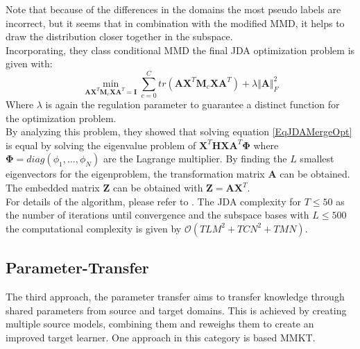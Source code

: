 Note that because of the differences in the domains the most pseudo labels are incorrect, but it seems that in combination with the modified \acs{MMD}, it helps to draw the distribution closer together in the subspace.\cite{Long.}\\
Incorporating, they class conditional \acs{MMD} the final \acs{JDA} optimization problem is given with:\cite{Long.}
\begin{equation}\label{EqJDAMergeOpt}
\min_{\mathbf{A}\mathbf{X}^T\mathbf{M}_c\mathbf{X}\mathbf{A}^T=\mathbf{I}} \sum_{c=0}^{C} tr(\mathbf{A}\mathbf{X}^T\mathbf{M}_c\mathbf{X}\mathbf{A}^T) + \lambda \Vert\mathbf{A}\Vert^2_F
\end{equation}
Where $\lambda$ is again the regulation parameter to guarantee a distinct function for the optimization problem.\\
By analyzing this problem, they showed that solving equation \eqref{EqJDAMergeOpt} is equal by solving the eigenvalue problem of $\mathbf{X}^T\mathbf{HX}\mathbf{A}^T\boldsymbol{\Phi}$ where $\boldsymbol{\Phi} = diag(\phi_1,\dots,\phi_N)$ are the Lagrange multiplier. By finding the $L$ smallest eigenvectors for the eigenproblem, the transformation matrix $\mathbf{A}$ can be obtained. The embedded matrix $\mathbf{Z}$ can be obtained with $\mathbf{Z} = \mathbf{A}\mathbf{X}^T$.\cite{Long.}\\
For details of the algorithm, please refer to \cite{Long.}.
The \acs{JDA} complexity for $T\le 50$ as the number of iterations until convergence and the subspace bases with $L\le 500$ the computational complexity is given by $\mathcal{O}(TLM^2+TCN^2+TMN)$.\cite{Long.}
\subsection{Parameter-Transfer}\label{TlSubSecPara}
The third approach, the parameter transfer aims to transfer knowledge through shared parameters from source and target domains.
This is achieved by creating multiple source models, combining them and reweighs them to create an improved target learner.
One approach in this category is based \ac{MMKT}.\cite[p. 7-8]{Weiss.2016}
